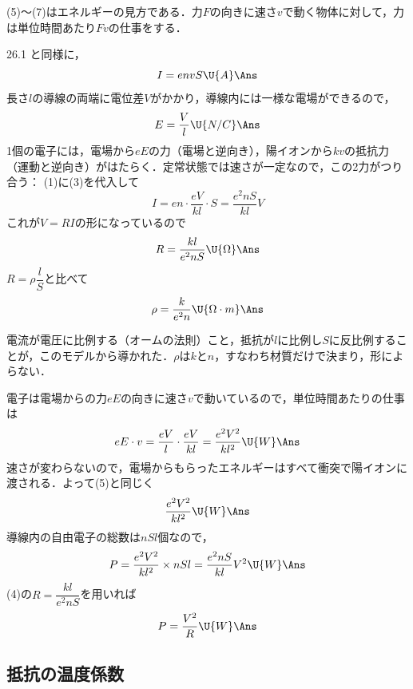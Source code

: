 \begin{reidaiunit}
\begin{sisinE}
(5)〜(7)はエネルギーの見方である．力$F$の向きに速さ$v$で動く物体に対して，力は単位時間あたり$Fv$の仕事をする．
\end{sisinE}


\begin{kaitou}
\begin{komon}
 26.1 と同様に，
       \[I=envS\U{A}\Ans\]
 長さ$l$の導線の両端に電位差$V$がかかり，導線内には一様な電場ができるので，
       \[E=\frac{V}{l}\U{N/C}\Ans\]
 1個の電子には，電場から$eE$の力（電場と逆向き），陽イオンから$kv$の抵抗力（運動と逆向き）がはたらく．定常状態では速さが一定なので，この2力がつり合う：
 (1)に(3)を代入して
       \[I=en\cdot\frac{eV}{kl}\cdot S=\frac{e^2nS}{kl}V\]
       これが$V=RI$の形になっているので
       \[R=\frac{kl}{e^2nS}\U{\Omega}\Ans\]
       $R=\rho\dfrac{l}{S}$と比べて
       \[\rho=\frac{k}{e^2n}\U{\Omega\cdot m}\Ans\]
       \begin{chuu}
       電流が電圧に比例する（オームの法則）こと，抵抗が$l$に比例し$S$に反比例することが，このモデルから導かれた．$\rho$は$k$と$n$，すなわち材質だけで決まり，形によらない．
       \end{chuu}
 電子は電場からの力$eE$の向きに速さ$v$で動いているので，単位時間あたりの仕事は
       \[eE\cdot v=\frac{eV}{l}\cdot\frac{eV}{kl}=\frac{e^2V^2}{kl^2}\U{W}\Ans\]
 速さが変わらないので，電場からもらったエネルギーはすべて衝突で陽イオンに渡される．よって(5)と同じく
       \[\frac{e^2V^2}{kl^2}\U{W}\Ans\]
 導線内の自由電子の総数は$nSl$個なので，
       \[P=\frac{e^2V^2}{kl^2}\times nSl=\frac{e^2nS}{kl}V^2\U{W}\Ans\]
       (4)の$R=\dfrac{kl}{e^2nS}$を用いれば
       \[P=\frac{V^2}{R}\U{W}\Ans\]
\end{komon}
\end{kaitou}
\end{reidaiunit}

\subsection{抵抗の温度係数}

